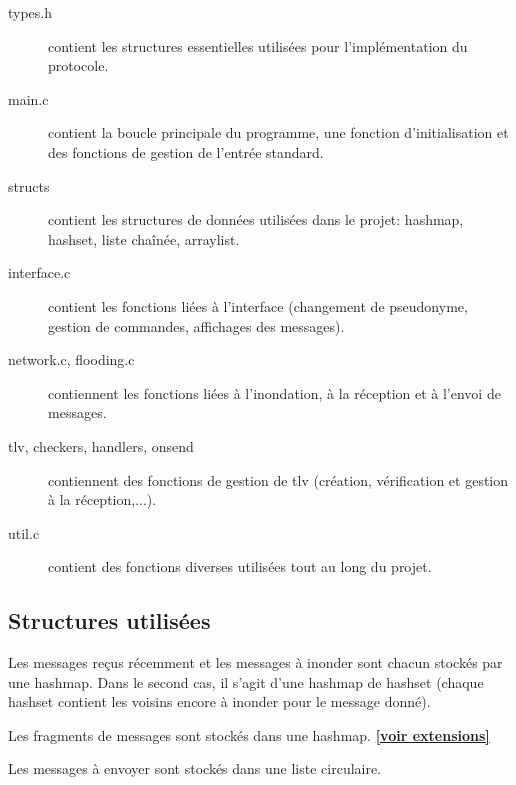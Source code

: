 \documentclass[a4paper,10pt]{article} %
\begin{document}
\begin{description}
\item[types.h] contient les structures essentielles utilisées pour l'implémentation du protocole.
\item[main.c] contient la boucle principale du programme, une fonction d'initialisation et des fonctions de gestion de l'entrée standard.
\item[structs] contient les structures de données utilisées dans le projet: hashmap, hashset, liste chaînée, arraylist.
\item[interface.c] contient les fonctions liées à l'interface (changement de pseudonyme, gestion de commandes, affichages des messages).
\item[network.c, flooding.c] contiennent les fonctions liées à l'inondation, à la réception et à l'envoi de messages.
\item[tlv, checkers, handlers, onsend] contiennent des fonctions de gestion de tlv (création, vérification et gestion à la réception,...).
\item[util.c] contient des fonctions diverses utilisées tout au long du projet.
\end{description}

\subsection{Structures utilisées\label{sec:struct}}
Les messages reçus récemment et les messages à inonder sont chacun stockés par une hashmap. Dans le second cas, il s'agit d'une hashmap de hashset (chaque hashset contient les voisins encore à inonder pour le message donné).

Les fragments de messages sont stockés dans une hashmap. \hyperref[sec:frag]{\textbf{[voir extensions]}}

Les messages à envoyer sont stockés dans une liste circulaire.
\end{document}
